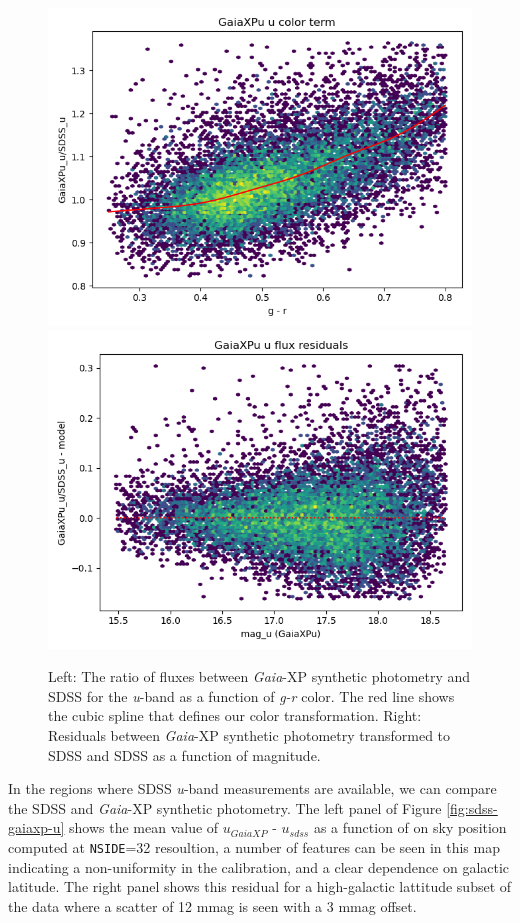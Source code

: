 \begin{figure}
    \includegraphics[width=0.49\linewidth]{./figures/color_terms/GaiaXPu_to_SDSS_band_u_color_term.png}
    \includegraphics[width=0.49\linewidth]{./figures/color_terms/GaiaXPu_to_SDSS_band_u_flux_residuals.png}
    \caption{Left: The ratio of fluxes between \emph{Gaia}-XP synthetic photometry and SDSS for the \textit{u}-band as a function of \textit{g-r} color. The red line shows the cubic spline that defines our color transformation.
    Right: Residuals between \emph{Gaia}-XP synthetic photometry transformed to SDSS and SDSS as a function of magnitude.}
    \label{fig:color-gaiaxp-usdss-u}
\end{figure}


In the regions where SDSS \textit{u}-band measurements are available, we can compare the SDSS and \emph{Gaia}-XP synthetic photometry.
The left panel of Figure \ref{fig:sdss-gaiaxp-u} shows the mean value of $u_{GaiaXP}$ - $u_{sdss}$ as a function of on sky position computed at \texttt{NSIDE}=32 resoultion, a number of features can be seen in this map indicating a non-uniformity in the calibration, and a clear dependence on galactic latitude.
The right panel shows this residual for a high-galactic lattitude subset of the data where a scatter of 12 mmag is seen with a 3 mmag offset.

